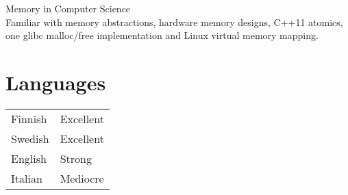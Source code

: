 \documentclass[12pt]{article}
\begin{document}
\large{Memory in Computer Science}\\
\normalsize{Familiar with memory abstractions, hardware memory designs, C++11
atomics, one glibc malloc/free implementation and Linux virtual memory
mapping.}\\


\section*{Languages}
\begin{tabular}{ll}
Finnish & Excellent\\
Swedish & Excellent\\
English & Strong\\
Italian & Mediocre\\
\end{tabular}
\end{document}
